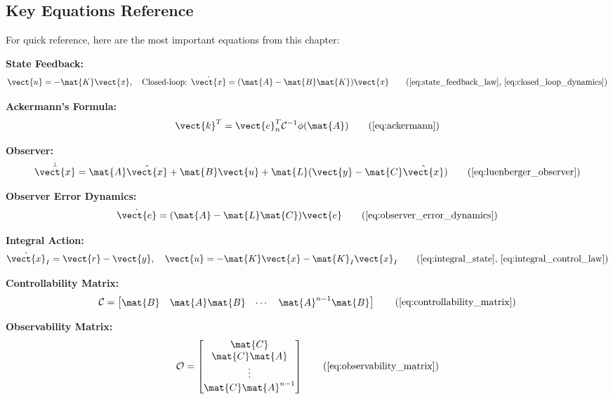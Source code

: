 \subsection{Key Equations Reference}

For quick reference, here are the most important equations from this chapter:

\textbf{State Feedback:}
\begin{equation}
\vect{u} = -\mat{K}\vect{x}, \quad \text{Closed-loop: } \dot{\vect{x}} = (\mat{A} - \mat{B}\mat{K})\vect{x}
\tag{\ref{eq:state_feedback_law}, \ref{eq:closed_loop_dynamics}}
\end{equation}

\textbf{Ackermann's Formula:}
\begin{equation}
\vect{k}^T = \vect{e}_n^T\mathcal{C}^{-1}\phi(\mat{A})
\tag{\ref{eq:ackermann}}
\end{equation}

\textbf{Observer:}
\begin{equation}
\dot{\hat{\vect{x}}} = \mat{A}\hat{\vect{x}} + \mat{B}\vect{u} + \mat{L}(\vect{y} - \mat{C}\hat{\vect{x}})
\tag{\ref{eq:luenberger_observer}}
\end{equation}

\textbf{Observer Error Dynamics:}
\begin{equation}
\dot{\vect{e}} = (\mat{A} - \mat{L}\mat{C})\vect{e}
\tag{\ref{eq:observer_error_dynamics}}
\end{equation}

\textbf{Integral Action:}
\begin{equation}
\dot{\vect{x}}_I = \vect{r} - \vect{y}, \quad \vect{u} = -\mat{K}\vect{x} - \mat{K}_I\vect{x}_I
\tag{\ref{eq:integral_state}, \ref{eq:integral_control_law}}
\end{equation}

\textbf{Controllability Matrix:}
\begin{equation}
\mathcal{C} = \begin{bmatrix} \mat{B} & \mat{A}\mat{B} & \cdots & \mat{A}^{n-1}\mat{B} \end{bmatrix}
\tag{\ref{eq:controllability_matrix}}
\end{equation}

\textbf{Observability Matrix:}
\begin{equation}
\mathcal{O} = \begin{bmatrix} \mat{C} \\ \mat{C}\mat{A} \\ \vdots \\ \mat{C}\mat{A}^{n-1} \end{bmatrix}
\tag{\ref{eq:observability_matrix}}
\end{equation}

